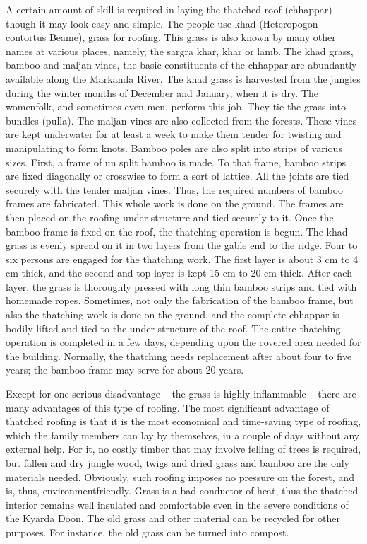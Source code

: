 A certain amount of skill is required in laying the thatched roof (chhappar) though it may look easy and simple. The people use khad (Heteropogon contortus Beame), grass for roofing. This grass is also known by many other names at various places, namely, the sargra khar, khar or lamb. The khad grass, bamboo and maljan vines, the basic constituents of the chhappar are abundantly available along the Markanda River. The khad grass is harvested from the jungles during the winter months of December and January, when it is dry. The womenfolk, and sometimes even men, perform this job. They tie the grass into bundles (pulla). The maljan vines are also collected from the forests. These vines are kept underwater for at least a week to make them tender for twisting and manipulating to form knots. Bamboo poles are also split into strips of various sizes. First, a frame of un split bamboo is made. To that frame, bamboo strips are fixed diagonally or crosswise to form a sort of lattice. All the joints are tied securely with the tender maljan vines. Thus, the required numbers of bamboo frames are fabricated. This whole work is done on the ground. The frames are then placed on the roofing under-structure and tied securely to it. Once the bamboo frame is fixed on the roof, the thatching operation is begun. The khad grass is evenly spread on it in two layers from the gable end to the ridge. Four to six persons are engaged for the thatching work. The first layer is about 3 cm to 4 cm thick, and the second and top layer is kept 15 cm to 20 cm thick. After each layer, the grass is thoroughly pressed with long thin bamboo strips and tied with homemade ropes. Sometimes, not only the fabrication of the bamboo frame, but also the thatching work is done on the ground, and the complete chhappar is bodily lifted and tied to the under-structure of the roof. The entire thatching operation is completed in a few days, depending upon the covered area needed for the building. Normally, the thatching needs replacement after about four to five years; the bamboo frame may serve for about 20 years.

Except for one serious disadvantage – the grass is highly inflammable – there are many advantages of this type of roofing. The most significant advantage of thatched roofing is that it is the most economical and time-saving type of roofing, which the family members can lay by themselves, in a couple of days without any external help. For it, no costly timber that may involve felling of trees is required, but fallen and dry jungle wood, twigs and dried grass and bamboo are the only materials needed. Obviously, such roofing imposes no pressure on the forest, and is, thus, environmentfriendly. Grass is a bad conductor of heat, thus the thatched interior remains well insulated and comfortable even in the severe conditions of the Kyarda Doon. The old grass and other material can be recycled for other purposes. For instance, the old grass can be turned into compost.

